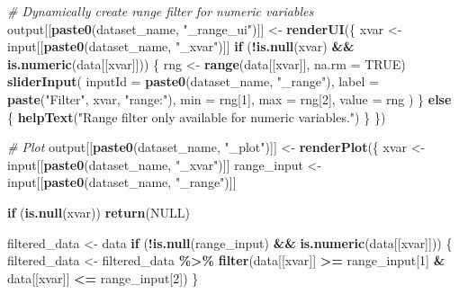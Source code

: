 \documentclass[
]{article}
\newenvironment{Shaded}{\begin{snugshade}}{\end{snugshade}}
\newcommand{\AttributeTok}[1]{\textcolor[rgb]{0.13,0.29,0.53}{#1}}
\newcommand{\CommentTok}[1]{\textcolor[rgb]{0.56,0.35,0.01}{\textit{#1}}}
\newcommand{\ConstantTok}[1]{\textcolor[rgb]{0.56,0.35,0.01}{#1}}
\newcommand{\ControlFlowTok}[1]{\textcolor[rgb]{0.13,0.29,0.53}{\textbf{#1}}}
\newcommand{\DecValTok}[1]{\textcolor[rgb]{0.00,0.00,0.81}{#1}}
\newcommand{\FunctionTok}[1]{\textcolor[rgb]{0.13,0.29,0.53}{\textbf{#1}}}
\newcommand{\NormalTok}[1]{#1}
\newcommand{\OtherTok}[1]{\textcolor[rgb]{0.56,0.35,0.01}{#1}}
\newcommand{\SpecialCharTok}[1]{\textcolor[rgb]{0.81,0.36,0.00}{\textbf{#1}}}
\newcommand{\StringTok}[1]{\textcolor[rgb]{0.31,0.60,0.02}{#1}}
\begin{document}
\begin{Shaded}
\begin{Highlighting}[]
    \CommentTok{\# Dynamically create range filter for numeric variables}
\NormalTok{    output[[}\FunctionTok{paste0}\NormalTok{(dataset\_name, }\StringTok{"\_range\_ui"}\NormalTok{)]] }\OtherTok{\textless{}{-}} \FunctionTok{renderUI}\NormalTok{(\{}
\NormalTok{      xvar }\OtherTok{\textless{}{-}}\NormalTok{ input[[}\FunctionTok{paste0}\NormalTok{(dataset\_name, }\StringTok{"\_xvar"}\NormalTok{)]]}
      \ControlFlowTok{if}\NormalTok{ (}\SpecialCharTok{!}\FunctionTok{is.null}\NormalTok{(xvar) }\SpecialCharTok{\&\&} \FunctionTok{is.numeric}\NormalTok{(data[[xvar]])) \{}
\NormalTok{        rng }\OtherTok{\textless{}{-}} \FunctionTok{range}\NormalTok{(data[[xvar]], }\AttributeTok{na.rm =} \ConstantTok{TRUE}\NormalTok{)}
        \FunctionTok{sliderInput}\NormalTok{(}
          \AttributeTok{inputId =} \FunctionTok{paste0}\NormalTok{(dataset\_name, }\StringTok{"\_range"}\NormalTok{),}
          \AttributeTok{label =} \FunctionTok{paste}\NormalTok{(}\StringTok{"Filter"}\NormalTok{, xvar, }\StringTok{"range:"}\NormalTok{),}
          \AttributeTok{min =}\NormalTok{ rng[}\DecValTok{1}\NormalTok{], }\AttributeTok{max =}\NormalTok{ rng[}\DecValTok{2}\NormalTok{],}
          \AttributeTok{value =}\NormalTok{ rng}
\NormalTok{        )}
\NormalTok{      \} }\ControlFlowTok{else}\NormalTok{ \{}
        \FunctionTok{helpText}\NormalTok{(}\StringTok{"Range filter only available for numeric variables."}\NormalTok{)}
\NormalTok{      \}}
\NormalTok{    \})}
    
    \CommentTok{\# Plot}
\NormalTok{    output[[}\FunctionTok{paste0}\NormalTok{(dataset\_name, }\StringTok{"\_plot"}\NormalTok{)]] }\OtherTok{\textless{}{-}} \FunctionTok{renderPlot}\NormalTok{(\{}
\NormalTok{      xvar }\OtherTok{\textless{}{-}}\NormalTok{ input[[}\FunctionTok{paste0}\NormalTok{(dataset\_name, }\StringTok{"\_xvar"}\NormalTok{)]]}
\NormalTok{      range\_input }\OtherTok{\textless{}{-}}\NormalTok{ input[[}\FunctionTok{paste0}\NormalTok{(dataset\_name, }\StringTok{"\_range"}\NormalTok{)]]}
      
      \ControlFlowTok{if}\NormalTok{ (}\FunctionTok{is.null}\NormalTok{(xvar)) }\FunctionTok{return}\NormalTok{(}\ConstantTok{NULL}\NormalTok{)}
      
\NormalTok{      filtered\_data }\OtherTok{\textless{}{-}}\NormalTok{ data}
      \ControlFlowTok{if}\NormalTok{ (}\SpecialCharTok{!}\FunctionTok{is.null}\NormalTok{(range\_input) }\SpecialCharTok{\&\&} \FunctionTok{is.numeric}\NormalTok{(data[[xvar]])) \{}
\NormalTok{        filtered\_data }\OtherTok{\textless{}{-}}\NormalTok{ filtered\_data }\SpecialCharTok{\%\textgreater{}\%}
          \FunctionTok{filter}\NormalTok{(data[[xvar]] }\SpecialCharTok{\textgreater{}=}\NormalTok{ range\_input[}\DecValTok{1}\NormalTok{] }\SpecialCharTok{\&}\NormalTok{ data[[xvar]] }\SpecialCharTok{\textless{}=}\NormalTok{ range\_input[}\DecValTok{2}\NormalTok{])}
\NormalTok{      \}}
      

\end{Highlighting}
\end{Shaded}
\end{document}
